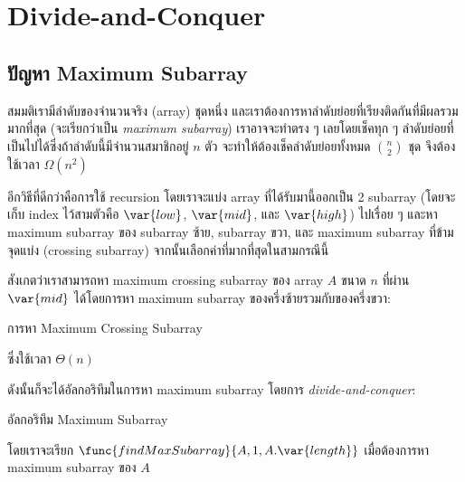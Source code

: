 \chapter{Divide-and-Conquer}

\section{ปัญหา Maximum Subarray}

สมมติเรามีลำดับของจำนวนจริง (array) ชุดหนึ่ง และเราต้องการหาลำดับย่อยที่เรียงติดกันที่มีผลรวมมากที่สุด (จะเรียกว่าเป็น \emph{maximum subarray}) เราอาจจะทำตรง ๆ เลยโดยเช็คทุก ๆ ลำดับย่อยที่เป็นไปได้ซึ่งถ้าลำดับนี้มีจำนวนสมาชิกอยู่ $n$ ตัว จะทำให้ต้องเช็คลำดับย่อยทั้งหมด $\binom{n}{2}$ ชุด จึงต้องใช้เวลา $\Omega(n^2)$

อีกวิธีที่ดีกว่าคือการใช้ recursion โดยเราจะแบ่ง array ที่ได้รับมานี้ออกเป็น 2 subarray (โดยจะเก็บ index ไว้สามตัวคือ $\var{low}$, $\var{mid}$, และ $\var{high}$) ไปเรื่อย ๆ และหา maximum subarray ของ subarray ซ้าย, subarray ขวา, และ maximum subarray ที่ข้ามจุดแบ่ง (crossing subarray) จากนั้นเลือกค่าที่มากที่สุดในสามกรณีนี้

สังเกตว่าเราสามารถหา maximum crossing subarray ของ array $A$ ขนาด $n$ ที่ผ่าน $\var{mid}$ ได้โดยการหา maximum subarray ของครึ่งซ้ายรวมกับของครึ่งขวา:
\begin{codebox}{การหา Maximum Crossing Subarray}

\end{codebox}
ซึ่งใช้เวลา $\Theta(n)$

ดังนั้นก็จะได้อัลกอริทึมในการหา maximum subarray โดยการ \emph{divide-and-conquer}:
\begin{codebox}{อัลกอริทึม Maximum Subarray}
\end{codebox}
โดยเราจะเรียก $\func{findMaxSubarray}{A, 1, A.\var{length}}$ เมื่อต้องการหา maximum subarray ของ $A$ 

